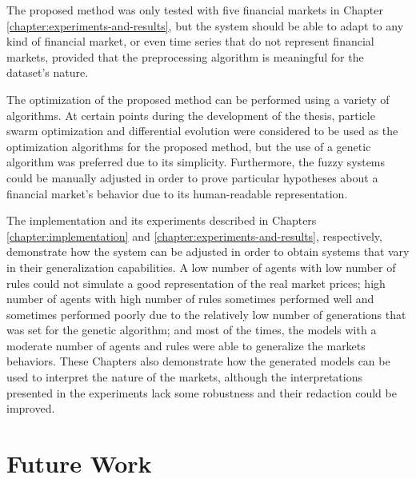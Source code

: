 The proposed method was only tested with five financial markets in Chapter
\ref{chapter:experiments-and-results}, but the system should be able to adapt to
any kind of financial market, or even time series that do not represent
financial markets, provided that the preprocessing algorithm is meaningful for
the dataset's nature.

The optimization of the proposed method can be performed using a variety of
algorithms. At certain points during the development of the thesis, particle
swarm optimization and differential evolution were considered to be used as the
optimization algorithms for the proposed method, but the use of a genetic
algorithm was preferred due to its simplicity. Furthermore, the fuzzy systems
could be manually adjusted in order to prove particular hypotheses about a
financial market's behavior due to its human-readable representation.

The implementation and its experiments described in Chapters
\ref{chapter:implementation} and \ref{chapter:experiments-and-results},
respectively, demonstrate how the system can be adjusted in order to obtain
systems that vary in their generalization capabilities. A low number of
agents with low number of rules could not simulate a good representation of the
real market prices; high number of agents with high number of rules sometimes
performed well and sometimes performed poorly due to the relatively low number
of generations that was set for the genetic algorithm; and most of the times,
the models with a moderate number of agents and rules were able to generalize
the markets behaviors. These Chapters also demonstrate how the generated models
can be used to interpret the nature of the markets, although the interpretations
presented in the experiments lack some robustness and their redaction could be
improved.

\section{Future Work}
\label{section:future-work}
